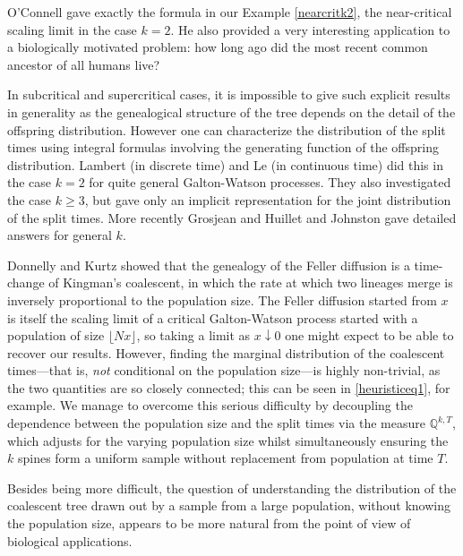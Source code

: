 \documentclass{article}
\theoremstyle{plain}
\theoremstyle{definition}
\newcommand{\Q}{\mathbb{Q}}
\begin{document}
O'Connell \cite{oconnell:genealogy_mrca} gave exactly the formula in our Example \ref{nearcritk2}, the near-critical scaling limit in the case $k=2$. He also provided a very interesting application to a biologically motivated problem: how long ago did the most recent common ancestor of all humans live?

In subcritical and supercritical cases, it is impossible to give such explicit results in generality as the genealogical structure of the tree depends on the detail of the offspring distribution. However one can characterize the distribution of the split times using integral formulas involving the generating function of the offspring distribution. Lambert \cite{lambert:coalescence_GW} (in discrete time) and Le \cite{le:coalescence_GW} (in continuous time) did this in the case $k=2$ for quite general Galton-Watson processes. They also investigated the case $k\ge 3$, but gave only an implicit representation for the joint distribution of the split times. More recently Grosjean and Huillet \cite{grosjean_huillet:genealogy_coalescence} and Johnston \cite{johnston:coalescence_subcrit_supercrit} gave detailed answers for general $k$.

Donnelly and Kurtz \cite[Theorem 5.1]{donnelly_kurtz:particle_measure_popn_models} showed that the genealogy of the Feller diffusion is a time-change of Kingman's coalescent, in which the rate at which two lineages merge is inversely proportional to the population size. The Feller diffusion started from $x$ is itself the scaling limit of a critical Galton-Watson process started with a population of size $\lfloor Nx\rfloor$, so taking a limit as $x\downarrow 0$ one might expect to be able to recover our results. However, finding the marginal distribution of the coalescent times---that is, \emph{not} conditional on the population size---is highly non-trivial, as the two quantities are so closely connected; this can be seen in \eqref{heuristiceq1}, for example. We manage to overcome this serious difficulty by decoupling the dependence between the population size and the split times via the measure $\Q^{k,T}$, which adjusts for the varying population size whilst simultaneously ensuring the $k$ spines form a uniform sample without replacement from population at time $T$.

Besides being more difficult, the question of understanding the distribution of the coalescent tree drawn out by a sample from a large population, without knowing the population size, appears to be more natural from the point of view of biological applications.
\end{document}
